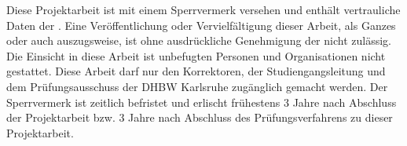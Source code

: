 Diese Projektarbeit ist mit einem Sperrvermerk versehen und enthält vertrauliche Daten der \ausbildungsbetrieb. Eine Veröffentlichung oder Vervielfältigung dieser Arbeit, als Ganzes oder auch auszugsweise, ist ohne ausdrückliche Genehmigung der \ausbildungsbetrieb nicht zulässig. Die Einsicht in diese Arbeit ist unbefugten Personen und Organisationen nicht gestattet. Diese Arbeit darf nur den Korrektoren, der Studiengangsleitung und dem Prüfungsausschuss der DHBW Karlsruhe zugänglich gemacht werden. Der Sperrvermerk ist zeitlich befristet und erlischt frühestens 3 Jahre nach Abschluss der Projektarbeit bzw. 3 Jahre nach Abschluss des Prüfungsverfahrens zu dieser Projektarbeit.